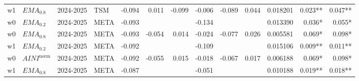 \begin{tabular}{@{}llllrrrrrrrrr@{}}
w1 & $EMA_{0.8}$ & 2024-2025 & TSM & -0.094 & 0.011 & -0.099 & -0.006 & -0.089 & 0.044 & 0.018201 & 0.023** & 0.047** \\
w0 & $EMA_{0.2}$ & 2024-2025 & META & -0.093 &  &  & -0.134 &  &  & 0.013390 & 0.036* & 0.055* \\
w0 & $EMA_{0.8}$ & 2024-2025 & META & -0.093 & -0.054 & 0.014 & -0.024 & -0.077 & 0.026 & 0.005581 & 0.069* & 0.098* \\
w1 & $EMA_{0.2}$ & 2024-2025 & META & -0.092 &  &  & -0.109 &  &  & 0.015106 & 0.009** & 0.011** \\
w0 & $AINI^{\mathrm{norm}}$ & 2024-2025 & META & -0.092 & -0.055 & 0.015 & -0.018 & -0.067 & 0.017 & 0.006188 & 0.069* & 0.098* \\
w1 & $EMA_{0.8}$ & 2024-2025 & META & -0.087 &  &  & -0.051 &  &  & 0.010188 & 0.019** & 0.018** \\
\bottomrule
\end{tabular}
